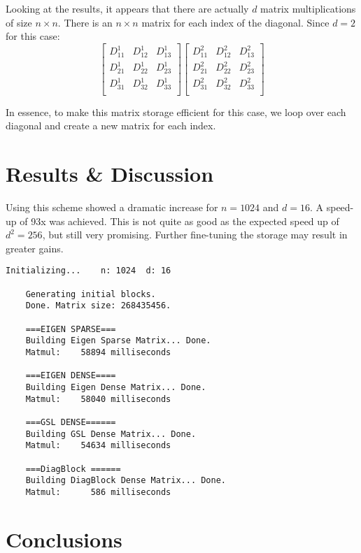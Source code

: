 \documentclass[letterpaper, 10pt, twoside]{article}
\begin{document}
	Looking at the results, it appears that there are actually $d$ matrix multiplications of size $n\times n$. There is an $n\times n$ matrix for each index of the diagonal. Since $d=2$ for this case:
	\[
	\begin{bmatrix}
	D_{11}^1 & D_{12}^1 & D_{13}^1  \\
	D_{21}^1 & D_{22}^1 & D_{23}^1  \\
	D_{31}^1 & D_{32}^1 & D_{33}^1  \\
	\end{bmatrix}
	\begin{bmatrix}
	D_{11}^2 & D_{12}^2 & D_{13}^2  \\
	D_{21}^2 & D_{22}^2 & D_{23}^2  \\
	D_{31}^2 & D_{32}^2 & D_{33}^2  \\
	\end{bmatrix}
	\]
	
	In essence, to make this matrix storage efficient for this case, we loop over each diagonal and create a new matrix for each index.
	
	\section{Results \& Discussion}
	
	Using this scheme showed a dramatic increase for $n=1024$ and $d=16$. A speed-up of 93x was achieved. This is not quite as good as the expected speed up of $d^2=256$, but still very promising. Further fine-tuning the storage may result in greater gains.
	\begin{lstlisting}[caption=The output of BlockDiag executable.]
	Initializing...    n: 1024  d: 16
	
	Generating initial blocks.
	Done. Matrix size: 268435456.
	
	===EIGEN SPARSE===
	Building Eigen Sparse Matrix... Done.
	Matmul:    58894 milliseconds
	
	===EIGEN DENSE====
	Building Eigen Dense Matrix... Done.
	Matmul:    58040 milliseconds
	
	===GSL DENSE======
	Building GSL Dense Matrix... Done.
	Matmul:    54634 milliseconds
	
	===DiagBlock ======
	Building DiagBlock Dense Matrix... Done.
	Matmul:      586 milliseconds
	\end{lstlisting}
	
	\section{Conclusions}
	
\end{document}

